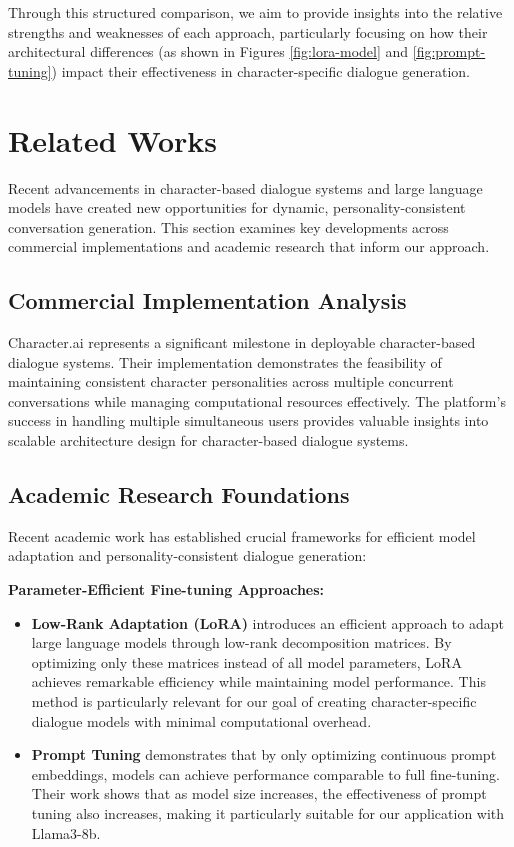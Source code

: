 \documentclass{article}
\begin{document}
Through this structured comparison, we aim to provide insights into the relative strengths and weaknesses of each approach, particularly focusing on how their architectural differences (as shown in Figures \ref{fig:lora-model} and \ref{fig:prompt-tuning}) impact their effectiveness in character-specific dialogue generation.



\section{Related Works}
Recent advancements in character-based dialogue systems and large language models have created new opportunities for dynamic, personality-consistent conversation generation. This section examines key developments across commercial implementations and academic research that inform our approach.

\subsection{Commercial Implementation Analysis}
Character.ai represents a significant milestone in deployable character-based dialogue systems. Their implementation demonstrates the feasibility of maintaining consistent character personalities across multiple concurrent conversations while managing computational resources effectively. The platform's success in handling multiple simultaneous users provides valuable insights into scalable architecture design for character-based dialogue systems.

\subsection{Academic Research Foundations}
Recent academic work has established crucial frameworks for efficient model adaptation and personality-consistent dialogue generation:

\textbf{Parameter-Efficient Fine-tuning Approaches:}
\begin{itemize}
\item \textbf{Low-Rank Adaptation (LoRA)} \cite{hu2021} introduces an efficient approach to adapt large language models through low-rank decomposition matrices. By optimizing only these matrices instead of all model parameters, LoRA achieves remarkable efficiency while maintaining model performance. This method is particularly relevant for our goal of creating character-specific dialogue models with minimal computational overhead.

\item \textbf{Prompt Tuning} \cite{lester2021} demonstrates that by only optimizing continuous prompt embeddings, models can achieve performance comparable to full fine-tuning. Their work shows that as model size increases, the effectiveness of prompt tuning also increases, making it particularly suitable for our application with Llama3-8b.
\end{itemize}
\end{document}
